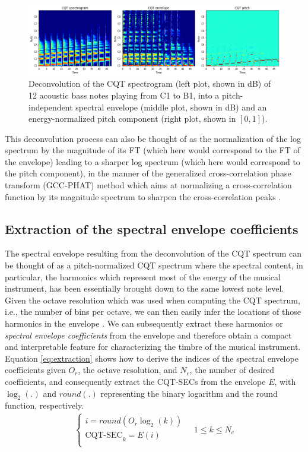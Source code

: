 \documentclass[journal]{IEEEtran}
\begin{document}
\begin{figure}[htp]
    \centering
    \includegraphics[width=\textwidth]{deconvolution.png}
    \caption{Deconvolution of the CQT spectrogram (left plot, shown in dB) of 12 acoustic bass notes playing from C1 to B1, into a pitch-independent spectral envelope (middle plot, shown in dB) and an energy-normalized pitch component (right plot, shown in $[0, 1]$).}
    \label{fig:deconvolution}
\end{figure}

This deconvolution process can also be thought of as the normalization of the log spectrum by the magnitude of its FT (which here would correspond to the FT of the envelope) leading to a sharper log spectrum (which here would correspond to the pitch component), in the manner of the generalized cross-correlation phase transform (GCC-PHAT) method which aims at normalizing a cross-correlation function by its magnitude spectrum to sharpen the cross-correlation peaks \cite{knapp1976}.


\subsection{Extraction of the spectral envelope coefficients}

The spectral envelope resulting from the deconvolution of the CQT spectrum can be thought of as a pitch-normalized CQT spectrum where the spectral content, in particular, the harmonics which represent most of the energy of the musical instrument, has been essentially brought down to the same lowest note level. Given the octave resolution which was used when computing the CQT spectrum, i.e., the number of bins per octave, we can then easily infer the locations of those harmonics in the envelope \cite{brown1991, brown1992}. We can subsequently extract these harmonics or \textit{spectral envelope coefficients} from the envelope and therefore obtain a compact and interpretable feature for characterizing the timbre of the musical instrument. Equation \ref{eq:extraction} shows how to derive the indices of the spectral envelope coefficients given $O_r$, the octave resolution, and $N_c$, the number of desired coefficients, and consequently extract the CQT-SECs from the envelope $E$, with $\log_2(.)$ and $round(.)$ representing the binary logarithm and the round function, respectively.
\begin{equation}
\label{eq:extraction}
\begin{split}
\begin{cases}
i = round(O_r \log_2(k)) \\
\text{CQT-SEC}_k = E(i) \\
\end{cases}
\quad 1 \le k \le N_c
\end{split}
\end{equation}
\end{document}
